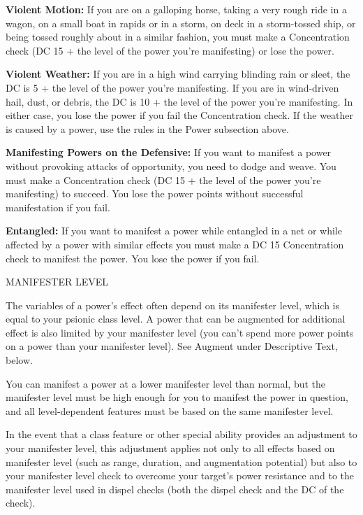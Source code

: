\documentclass{article}
\begin{document}
\textbf{Violent Motion: }If you are on a galloping horse, taking a very rough ride 
in a wagon, on a small boat in rapids or in a storm, on deck in a storm-tossed 
ship, or being tossed roughly about in a similar fashion, you must make a Concentration 
check (DC 15 + the level of the power you're manifesting) or lose the power.

\textbf{Violent Weather: }If you are in a high wind carrying blinding rain or sleet, 
the DC is 5 + the level of the power you're manifesting. If you are in wind-driven 
hail, dust, or debris, the DC is 10 + the level of the power you're manifesting. 
In either case, you lose the power if you fail the Concentration check. If the 
weather is caused by a power, use the rules in the Power subsection above.

\textbf{Manifesting Powers on the Defensive:} If you want to manifest a power without 
provoking attacks of opportunity, you need to dodge and weave. You must make a 
Concentration check (DC 15 + the level of the power you're manifesting) to succeed. 
You lose the power points without successful manifestation if you fail.

\textbf{Entangled:} If you want to manifest a power while entangled in a net or 
while affected by a power with similar effects you must make a DC 15 Concentration 
check to manifest the power. You lose the power if you fail.

\vspace{12pt}
MANIFESTER LEVEL

The variables of a power's effect often depend on its manifester level, which is 
equal to your psionic class level. A power that can be augmented for additional 
effect is also limited by your manifester level (you can't spend more power points 
on a power than your manifester level). See Augment under Descriptive Text, below.

You can manifest a power at a lower manifester level than normal, but the manifester 
level must be high enough for you to manifest the power in question, and all level-dependent 
features must be based on the same manifester level.

In the event that a class feature or other special ability provides an adjustment 
to your manifester level, this adjustment applies not only to all effects based 
on manifester level (such as range, duration, and augmentation potential) but also 
to your manifester level check to overcome your target's power resistance and to 
the manifester level used in dispel checks (both the dispel check and the DC of 
the check).
\end{document}
